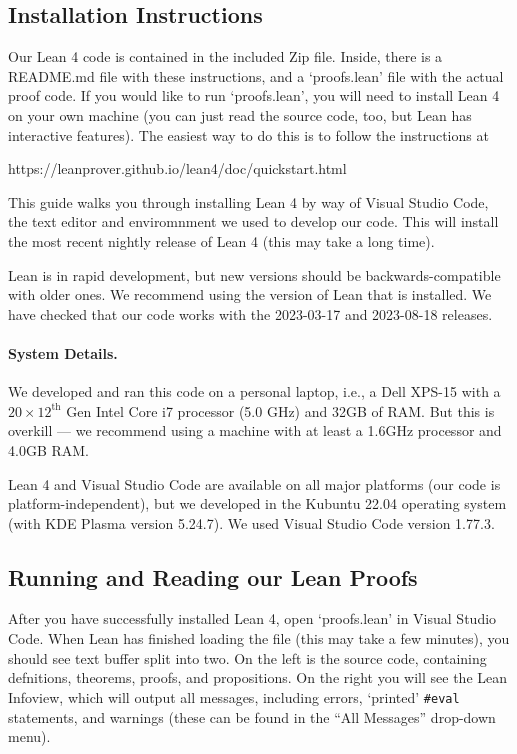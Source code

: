 \documentclass[letterpaper]{article}
\theoremstyle{definition}
\begin{document}
\subsection{Installation Instructions}

Our Lean 4 code is contained in the included Zip file.  Inside, there is a README.md file with these instructions, and a `proofs.lean' file with the actual proof code.  If you would like to run `proofs.lean', you will need to install Lean 4 on your own machine (you can just read the source code, too, but Lean has interactive features).  The easiest way to do this is to follow the instructions at
\begin{center}
    https://leanprover.github.io/lean4/doc/quickstart.html
\end{center}
This guide walks you through installing Lean 4 by way of Visual Studio Code, the text editor and enviromnment we used to develop our code.  This will install the most recent nightly release of Lean 4 (this may take a long time).  

Lean is in rapid development, but new versions should be backwards-compatible with older ones.  We recommend using the version of Lean that is installed.  We have checked that our code works with the 2023-03-17 and 2023-08-18 releases.

\paragraph{System Details.} We developed and ran this code on a personal laptop, i.e., a Dell XPS-15 with a $20 \times 12^{\text{th}}$ Gen Intel Core i7 processor (5.0 GHz) and 32GB of RAM.  But this is overkill --- we recommend using a machine with at least a 1.6GHz processor and 4.0GB RAM.

Lean 4 and Visual Studio Code are available on all major platforms (our code is platform-independent), but we developed in the Kubuntu 22.04 operating system (with KDE Plasma version 5.24.7).  We used Visual Studio Code version 1.77.3.

\subsection{Running and Reading our Lean Proofs}

After you have successfully installed Lean 4, open `proofs.lean' in Visual Studio Code.  When Lean has finished loading the file (this may take a few minutes), you should see text buffer split into two.  On the left is the source code, containing defnitions, theorems, proofs, and propositions.  On the right you will see the Lean Infoview, which will output all messages, including errors, `printed' \texttt{\#eval} statements, and warnings (these can be found in the ``All Messages'' drop-down menu).
\end{document}
